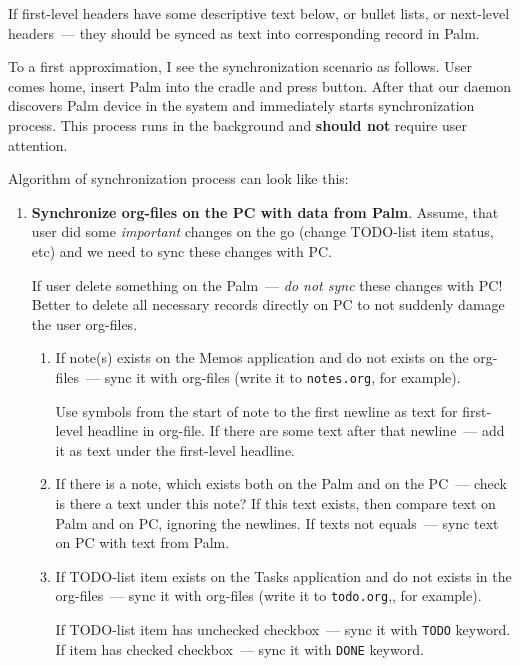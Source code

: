 \documentclass[a4paper,12pt,oneside]{scrartcl}
\begin{document}
If first-level headers have some descriptive text below, or bullet lists, or
next-level headers~--- they should be synced as text into corresponding record
in Palm.

To a first approximation, I see the synchronization scenario as follows. User
comes home, insert Palm into the cradle and press button. After that our daemon
discovers Palm device in the system and immediately starts synchronization
process. This process runs in the background and \textbf{should not} require
user attention.

Algorithm of synchronization process can look like this:
\begin{enumerate}
\item \textbf{Synchronize org-files on the PC with data from Palm}. Assume, that
  user did some \textit{important} changes on the go (change TODO-list item
  status, etc) and we need to sync these changes with PC.

  If user delete something on the Palm~--- \textit{do not sync} these changes
  with PC!  Better to delete all necessary records directly on PC to not
  suddenly damage the user org-files.

  \begin{enumerate}
  \item If note(s) exists on the Memos application and do not exists on the
    org-files~--- sync it with org-files (write it to \texttt{notes.org}, for
    example).

    Use symbols from the start of note to the first newline as text for
    first-level headline in org-file. If there are some text after that
    newline~--- add it as text under the first-level headline.
  \item If there is a note, which exists both on the Palm and on the PC~---
    check is there a text under this note? If this text exists, then compare
    text on Palm and on PC, ignoring the newlines. If texts not equals~--- sync
    text on PC with text from Palm.
  \item If TODO-list item exists on the Tasks application and do not exists in
    the org-files~--- sync it with org-files (write it to \texttt{todo.org},,
    for example).

    If TODO-list item has unchecked checkbox~--- sync it with \texttt{TODO}
    keyword. If item has checked checkbox~--- sync it with \texttt{DONE}
    keyword.


\end{enumerate}
\end{enumerate}
\end{document}
